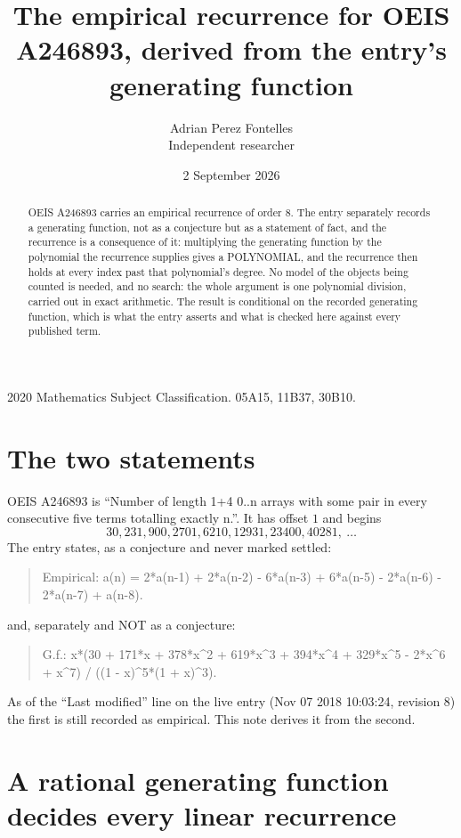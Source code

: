 \documentclass[11pt,a4paper]{article}
\title{The empirical recurrence for OEIS A246893, derived from the entry's generating function}
\author{Adrian Perez Fontelles\\ \small Independent researcher}
\date{2 September 2026}
\theoremstyle{plain}
\theoremstyle{definition}
\begin{document}
\maketitle

\begin{abstract}
OEIS A246893 carries an empirical recurrence of order $8$. The entry separately records a
generating function, not as a conjecture but as a statement of fact, and the recurrence is a
consequence of it: multiplying the generating function by the polynomial the recurrence
supplies gives a POLYNOMIAL, and the recurrence then holds at every index past that
polynomial's degree. No model of the objects being counted is needed, and no search: the
whole argument is one polynomial division, carried out in exact arithmetic. The result is
conditional on the recorded generating function, which is what the entry asserts and what is
checked here against every published term.
\end{abstract}

\noindent\small 2020 Mathematics Subject Classification. 05A15, 11B37, 30B10.\normalsize

\section{The two statements}

OEIS A246893 is ``Number of length 1+4 0..n arrays with some pair in every consecutive five terms totalling exactly n.''. It has offset $1$ and begins
\[
30, 231, 900, 2701, 6210, 12931, 23400, 40281,\ \dots
\]
The entry states, as a conjecture and never marked settled:
\begin{quote}
Empirical: a(n) = 2*a(n-1) + 2*a(n-2) - 6*a(n-3) + 6*a(n-5) - 2*a(n-6) - 2*a(n-7) + a(n-8).
\end{quote}
and, separately and NOT as a conjecture:
\begin{quote}
G.f.: x*(30 + 171*x + 378*x\^{}2 + 619*x\^{}3 + 394*x\^{}4 + 329*x\^{}5 - 2*x\^{}6 + x\^{}7) / ((1 - x)\^{}5*(1 + x)\^{}3).
\end{quote}
As of the ``Last modified'' line on the live entry (Nov 07 2018 10:03:24, revision 8) the first is still
recorded as empirical. This note derives it from the second.

\section{A rational generating function decides every linear recurrence}
\end{document}

